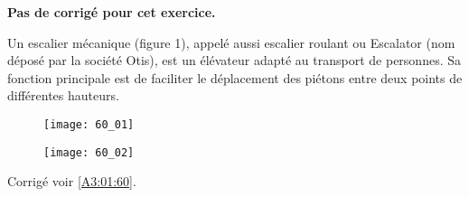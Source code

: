 \normaltrue \difficilefalse \tdifficilefalse
\correctionfalse

\setcounter{question}{0}

\ifcorrection
\else
\textbf{Pas de corrigé pour cet exercice.}
\fi

\ifprof
\else


Un escalier mécanique (figure 1), appelé aussi escalier roulant ou Escalator (nom déposé par la société Otis), est un élévateur adapté au transport de personnes. Sa fonction principale est de faciliter le déplacement des piétons entre deux points de différentes hauteurs. 



\begin{figure}[H]
\centering
\texttt{[image: 60\_01]}
\end{figure}

\begin{figure}[H]
\centering
\texttt{[image: 60\_02]}

\end{figure}
\fi




\ifprof
\else
\begin{flushright}
\footnotesize{Corrigé  voir \ref{A3:01:60}.}
\end{flushright}%
\fi
